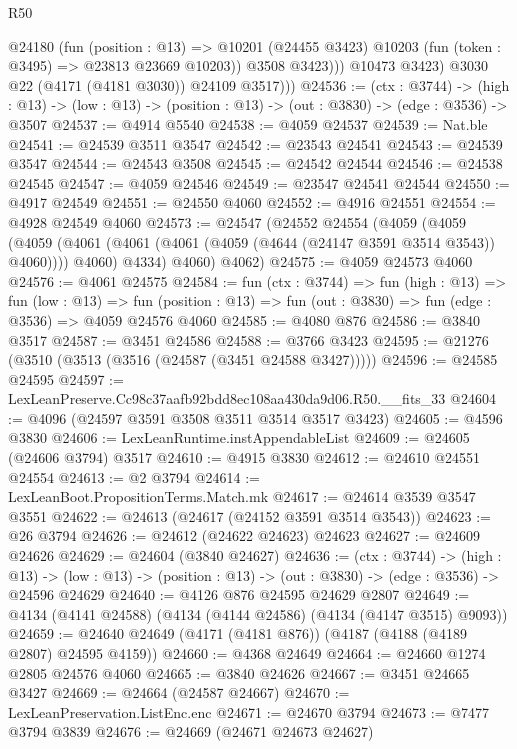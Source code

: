 \begin{lexlean}{R50}
\begin{coremodule}
                @24180
                  (fun (position : @13) =>
                  @10201 (@24455 @3423) @10203 (fun (token : @3495) => @23813 @23669 @10203))
                  @3508
                  @3423)))
            @10473
            @3423)
          @3030
          @22
          (@4171 (@4181 @3030))
          @24109
          @3517)))
@24536 := (ctx : @3744) ->
  (high : @13) -> (low : @13) -> (position : @13) -> (out : @3830) -> (edge : @3536) -> @3507
@24537 := @4914 @5540
@24538 := @4059 @24537
@24539 := Nat.ble
@24541 := @24539 @3511 @3547
@24542 := @23543 @24541
@24543 := @24539 @3547
@24544 := @24543 @3508
@24545 := @24542 @24544
@24546 := @24538 @24545
@24547 := @4059 @24546
@24549 := @23547 @24541 @24544
@24550 := @4917 @24549
@24551 := @24550 @4060
@24552 := @4916 @24551
@24554 := @4928 @24549 @4060
@24573 := @24547
    (@24552
      @24554
      (@4059
        (@4059
          (@4059 (@4061 (@4061 (@4061 (@4059 (@4644 (@24147 @3591 @3514 @3543)) @4060)))) @4060)
          @4334)
        @4060)
      @4062)
@24575 := @4059 @24573 @4060
@24576 := @4061 @24575
@24584 := fun (ctx : @3744) =>
  fun (high : @13) =>
  fun (low : @13) =>
  fun (position : @13) => fun (out : @3830) => fun (edge : @3536) => @4059 @24576 @4060
@24585 := @4080 @876
@24586 := @3840 @3517
@24587 := @3451 @24586
@24588 := @3766 @3423
@24595 := @21276 (@3510 (@3513 (@3516 (@24587 (@3451 @24588 @3427)))))
@24596 := @24585 @24595
@24597 := LexLeanPreserve.Cc98c37aafb92bdd8ec108aa430da9d06.R50.__fits_33
@24604 := @4096 (@24597 @3591 @3508 @3511 @3514 @3517 @3423)
@24605 := @4596 @3830
@24606 := LexLeanRuntime.instAppendableList
@24609 := @24605 (@24606 @3794) @3517
@24610 := @4915 @3830
@24612 := @24610 @24551 @24554
@24613 := @2 @3794
@24614 := LexLeanBoot.PropositionTerms.Match.mk
@24617 := @24614 @3539 @3547 @3551
@24622 := @24613 (@24617 (@24152 @3591 @3514 @3543))
@24623 := @26 @3794
@24626 := @24612 (@24622 @24623) @24623
@24627 := @24609 @24626
@24629 := @24604 (@3840 @24627)
@24636 := (ctx : @3744) ->
  (high : @13) ->
  (low : @13) -> (position : @13) -> (out : @3830) -> (edge : @3536) -> @24596 @24629
@24640 := @4126 @876 @24595 @24629 @2807
@24649 := @4134 (@4141 @24588) (@4134 (@4144 @24586) (@4134 (@4147 @3515) @9093))
@24659 := @24640 @24649 (@4171 (@4181 @876)) (@4187 (@4188 (@4189 @2807) @24595 @4159))
@24660 := @4368 @24649
@24664 := @24660 @1274 @2805 @24576 @4060
@24665 := @3840 @24626
@24667 := @3451 @24665 @3427
@24669 := @24664 (@24587 @24667)
@24670 := LexLeanPreservation.ListEnc.enc
@24671 := @24670 @3794
@24673 := @7477 @3794 @3839
@24676 := @24669 (@24671 @24673 @24627)

\end{coremodule}
\end{lexlean}
